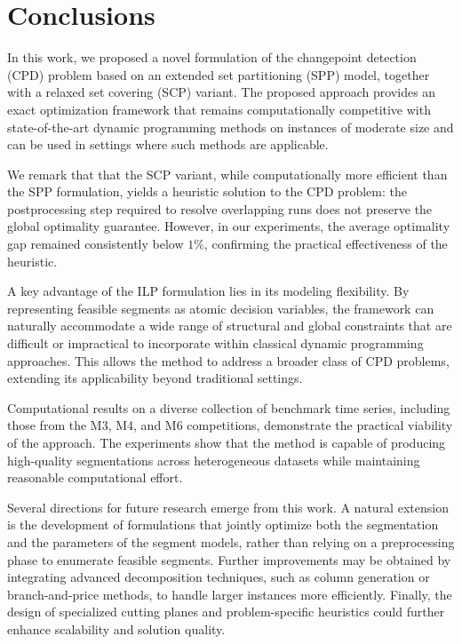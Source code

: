 \documentclass[preprints,article,submit,pdftex,moreauthors]{Definitions/mdpi}
\newcommand{\rev}[1]{{\color{blue}#1}}
\begin{document}
\section{Conclusions}              			\label{sec:conclusions}

In this work, we proposed a novel formulation of the changepoint detection (CPD) problem based on an extended set partitioning (SPP) model, together with a relaxed set covering (SCP) variant. The proposed approach provides an exact optimization framework that remains computationally competitive with state-of-the-art dynamic programming methods on instances of moderate size and can be used in settings where such methods are applicable.
\rev{We remark that that the SCP variant, while computationally more efficient than the SPP formulation, yields a heuristic solution to the CPD problem: the postprocessing step required to resolve overlapping runs does not preserve the global optimality guarantee. However, in our experiments, the average optimality gap remained consistently below $1\%$, confirming the practical effectiveness of the heuristic.
	
A key advantage of the ILP formulation lies in its modeling flexibility. By representing feasible segments as atomic decision variables, the framework can naturally accommodate a wide range of structural and global constraints that are difficult or impractical to incorporate within classical dynamic programming approaches. This allows the method to address a broader class of CPD problems, extending its applicability beyond traditional settings.}

Computational results on a diverse collection of benchmark time series, including those from the M3, M4, and M6 competitions, demonstrate the practical viability of the approach. The experiments show that the method is capable of producing high-quality segmentations across heterogeneous datasets while maintaining reasonable computational effort.

Several directions for future research emerge from this work. A natural extension is the development of formulations that jointly optimize both the segmentation and the parameters of the segment models, rather than relying on a preprocessing phase to enumerate feasible segments. Further improvements may be obtained by integrating advanced decomposition techniques, such as column generation or branch-and-price methods, to handle larger instances more efficiently. Finally, the design of specialized cutting planes and problem-specific heuristics could further enhance scalability and solution quality.
\end{document}
